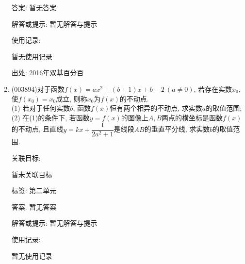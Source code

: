 \documentclass[10pt,a4paper]{article}
\begin{document}
\begin{enumerate}[1.]
答案: 暂无答案

解答或提示: 暂无解答与提示

使用记录:

暂无使用记录


出处: 2016年双基百分百
\item { (003894)}对于函数$f(x)=ax^2+(b+1)x+b-2 \ (a\ne 0)$, 若存在实数$x_0$, 使$f(x_0)=x_0$成立, 则称$x_0$为$f(x)$的不动点.\\
(1) 若对于任何实数$b$, 函数$f(x)$恒有两个相异的不动点, 求实数$a$的取值范围;\\
(2) 在(1)的条件下, 若函数$y=f(x)$的图像上$A,B$两点的横坐标是函数$f(x)$的不动点, 且直线$y=kx+\dfrac{1}{2a^2+1}$是线段$AB$的垂直平分线, 求实数$b$的取值范围.


关联目标:

暂未关联目标



标签: 第二单元

答案: 暂无答案

解答或提示: 暂无解答与提示

使用记录:

暂无使用记录



\end{enumerate}
\end{document}
